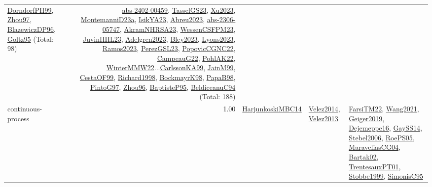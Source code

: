 {\begin{longtable}{p{3cm}r>{\raggedright\arraybackslash}p{6cm}>{\raggedright\arraybackslash}p{6cm}>{\raggedright\arraybackslash}p{8cm}}
\hyperref[detail:DorndorfPH99]{DorndorfPH99}, \hyperref[detail:Zhou97]{Zhou97}, \hyperref[detail:BlazewiczDP96]{BlazewiczDP96}, \hyperref[detail:Goltz95]{Goltz95} (Total: 98) & \hyperref[detail:abs-2402-00459]{abs-2402-00459}, \hyperref[detail:TasselGS23]{TasselGS23}, \hyperref[detail:Xu2023]{Xu2023}, \hyperref[detail:MontemanniD23a]{MontemanniD23a}, \hyperref[detail:IsikYA23]{IsikYA23}, \hyperref[detail:Abreu2023]{Abreu2023}, \hyperref[detail:abs-2306-05747]{abs-2306-05747}, \hyperref[detail:AkramNHRSA23]{AkramNHRSA23}, \hyperref[detail:WessenCSFPM23]{WessenCSFPM23}, \hyperref[detail:JuvinHHL23]{JuvinHHL23}, \hyperref[detail:Adelgren2023]{Adelgren2023}, \hyperref[detail:Bley2023]{Bley2023}, \hyperref[detail:Lyons2023]{Lyons2023}, \hyperref[detail:Ramos2023]{Ramos2023}, \hyperref[detail:PerezGSL23]{PerezGSL23}, \hyperref[detail:PopovicCGNC22]{PopovicCGNC22}, \hyperref[detail:CampeauG22]{CampeauG22}, \hyperref[detail:PohlAK22]{PohlAK22}, \hyperref[detail:WinterMMW22]{WinterMMW22}...\hyperref[detail:CarlssonKA99]{CarlssonKA99}, \hyperref[detail:JainM99]{JainM99}, \hyperref[detail:CestaOF99]{CestaOF99}, \hyperref[detail:Richard1998]{Richard1998}, \hyperref[detail:BockmayrK98]{BockmayrK98}, \hyperref[detail:PapaB98]{PapaB98}, \hyperref[detail:PintoG97]{PintoG97}, \hyperref[detail:Zhou96]{Zhou96}, \hyperref[detail:BaptisteP95]{BaptisteP95}, \hyperref[detail:BeldiceanuC94]{BeldiceanuC94} (Total: 188)\\
\index{continuous-process}\index{Concepts!continuous-process}continuous-process &  1.00 & \hyperref[detail:HarjunkoskiMBC14]{HarjunkoskiMBC14} & \hyperref[detail:Velez2014]{Velez2014}, \hyperref[detail:Velez2013]{Velez2013} & \hyperref[detail:FarsiTM22]{FarsiTM22}, \hyperref[detail:Wang2021]{Wang2021}, \hyperref[detail:Geiger2019]{Geiger2019}, \hyperref[detail:Dejemeppe16]{Dejemeppe16}, \hyperref[detail:GaySS14]{GaySS14}, \hyperref[detail:Stebel2006]{Stebel2006}, \hyperref[detail:RoePS05]{RoePS05}, \hyperref[detail:MaraveliasCG04]{MaraveliasCG04}, \hyperref[detail:Bartak02]{Bartak02}, \hyperref[detail:TrentesauxPT01]{TrentesauxPT01}, \hyperref[detail:Stobbe1999]{Stobbe1999}, \hyperref[detail:SimonisC95]{SimonisC95}\\

\end{longtable}}
